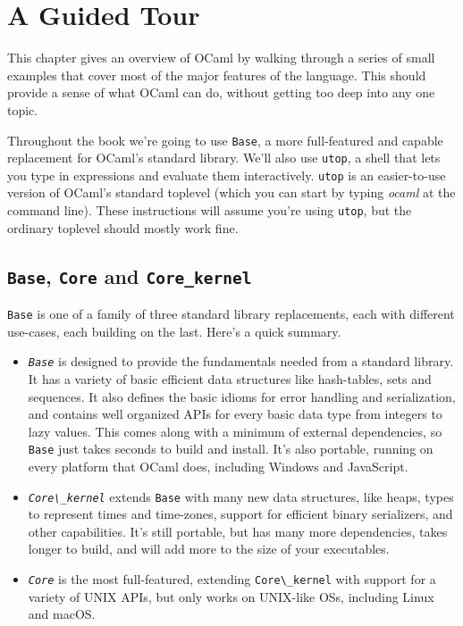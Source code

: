 \hypertarget{a-guided-tour}{%
\section{A Guided Tour}\label{a-guided-tour}}

This chapter gives an overview of OCaml by walking through a series of
small examples that cover most of the major features of the language.
This should provide a sense of what OCaml can do, without getting too
deep into any one topic.

Throughout the book we're going to use \passthrough{\lstinline!Base!}, a
more full-featured and capable replacement for OCaml's standard library.
We'll also use \passthrough{\lstinline!utop!}, a shell that lets you
type in expressions and evaluate them interactively.
\passthrough{\lstinline!utop!} is an easier-to-use version of OCaml's
standard toplevel (which you can start by typing \emph{ocaml} at the
command line). These instructions will assume you're using
\passthrough{\lstinline!utop!}, but the ordinary toplevel should mostly
work fine.

\hypertarget{base-core-and-core_kernel}{%
\subsection{\texorpdfstring{\texttt{Base}, \texttt{Core} and
\texttt{Core\_kernel}}{Base, Core and Core\_kernel}}\label{base-core-and-core_kernel}}

\passthrough{\lstinline!Base!} is one of a family of three standard
library replacements, each with different use-cases, each building on
the last. Here's a quick summary.

\begin{itemize}
\item
  \emph{\passthrough{\lstinline!Base!}} is designed to provide the
  fundamentals needed from a standard library. It has a variety of basic
  efficient data structures like hash-tables, sets and sequences. It
  also defines the basic idioms for error handling and serialization,
  and contains well organized APIs for every basic data type from
  integers to lazy values. This comes along with a minimum of external
  dependencies, so \passthrough{\lstinline!Base!} just takes seconds to
  build and install. It's also portable, running on every platform that
  OCaml does, including Windows and JavaScript.
\item
  \emph{\passthrough{\lstinline!Core\_kernel!}} extends
  \passthrough{\lstinline!Base!} with many new data structures, like
  heaps, types to represent times and time-zones, support for efficient
  binary serializers, and other capabilities. It's still portable, but
  has many more dependencies, takes longer to build, and will add more
  to the size of your executables.
\item
  \emph{\passthrough{\lstinline!Core!}} is the most full-featured,
  extending \passthrough{\lstinline!Core\_kernel!} with support for a
  variety of UNIX APIs, but only works on UNIX-like OSs, including Linux
  and macOS.
\end{itemize}

